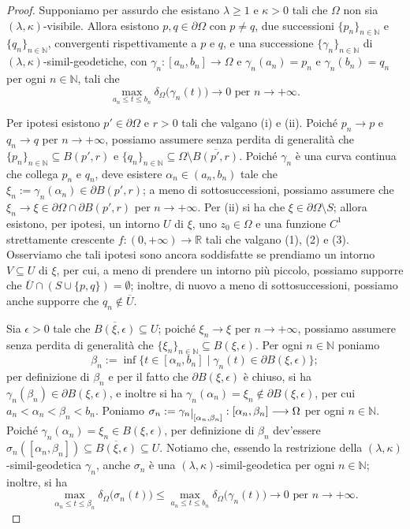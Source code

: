 \begin{proof}
    Supponiamo per assurdo che esistano $\lambda \ge 1$ e $\kappa>0$ tali che $\Omega$ non sia $(\lambda,\kappa)$-visibile. Allora esistono $p,q\in\partial\Omega$ con $p\not=q$, due successioni $\{p_n\}_{n\in\mathbb{N}}$ e $\{q_n\}_{n\in\mathbb{N}}$, convergenti rispettivamente a $p$ e $q$, e una successione $\{\gamma_n\}_{n\in\mathbb{N}}$ di $(\lambda,\kappa)$-simil-geodetiche, con $\gamma_n:[a_n,b_n]\longrightarrow\Omega$ e $\gamma_n(a_n)=p_n$ e $\gamma_n(b_n)=q_n$ per ogni $n\in\mathbb{N}$, tali che
    $$\max_{a_n\le t\le b_n}\delta_\Omega\big(\gamma_n(t)\big)\longrightarrow 0\text{ per }n\longrightarrow+\infty.$$

    Per ipotesi esistono $p'\in\partial\Omega$ e $r>0$ tali che valgano (i) e (ii). Poiché $p_n\longrightarrow p$ e $q_n\longrightarrow q$ per $n\longrightarrow+\infty$, possiamo assumere senza perdita di generalità che $\{p_n\}_{n\in\mathbb{N}}\subseteq B(p',r)$ e $\{q_n\}_{n\in\mathbb{N}}\subseteq \Omega\setminus\overline{B(p',r)}$. Poiché $\gamma_n$ è una curva continua che collega $p_n$ e $q_n$, deve esistere $\alpha_n\in(a_n,b_n)$ tale che $\xi_n:=\gamma_n(\alpha_n)\in\partial B(p',r)$; a meno di sottosuccessioni, possiamo assumere che $\xi_n\longrightarrow\xi\in\partial\Omega\cap\partial B(p',r)$ per $n\longrightarrow+\infty$. Per (ii) si ha che $\xi\in\partial\Omega\setminus S$; allora esistono, per ipotesi, un intorno $U$ di $\xi$, uno $z_0\in\Omega$ e una funzione $C^1$ strettamente crescente $f:(0,+\infty)\longrightarrow\mathbb{R}$ tali che valgano (1), (2) e (3). Osserviamo che tali ipotesi sono ancora soddisfatte se prendiamo un intorno $V \subseteq U$ di $\xi$, per cui, a meno di prendere un intorno più piccolo, possiamo supporre che $\overline{U}\cap(S\cup\{p,q\})=\emptyset$; inoltre, di nuovo a meno di sottosuccessioni, possiamo anche supporre che $q_n\not\in\overline{U}$.

    Sia $\epsilon>0$ tale che $\overline{B(\xi,\epsilon)}\subseteq U$; poiché $\xi_n\longrightarrow \xi$ per $n\longrightarrow+\infty$, possiamo assumere senza perdita di generalità che $\{\xi_n\}_{n\in\mathbb{N}}\subseteq B(\xi,\epsilon)$. Per ogni $n\in\mathbb{N}$ poniamo
    $$\beta_n:=\inf\{t\in[\alpha_n,b_n]\mid \gamma_n(t)\in\partial B(\xi,\epsilon)\};$$
    per definizione di $\beta_n$ e per il fatto che $\partial B(\xi,\epsilon)$ è chiuso, si ha $\gamma_n(\beta_n)\in\partial B(\xi,\epsilon)$, e inoltre si ha $\gamma_n(\alpha_n)=\xi_n\not\in\partial B(\xi,\epsilon)$, per cui $a_n<\alpha_n<\beta_n<b_n$. Poniamo $\sigma_n:=\gamma_n\restrict{[\alpha_n,\beta_n]}:[\alpha_n,\beta_n]\longrightarrow\Omega$ per ogni $n\in\mathbb{N}$. Poiché $\gamma_n(\alpha_n)=\xi_n\in B(\xi,\epsilon)$, per definizione di $\beta_n$ dev'essere $\sigma_n([\alpha_n,\beta_n])\subseteq\overline{B(\xi,\epsilon)}\subseteq U$. Notiamo che, essendo la restrizione della $(\lambda,\kappa)$-simil-geodetica $\gamma_n$, anche $\sigma_n$ è una $(\lambda,\kappa)$-simil-geodetica per ogni $n\in\mathbb{N}$; inoltre, si ha
    $$\max_{\alpha_n\le t\le \beta_n}\delta_\Omega\big(\sigma_n(t)\big)\le\max_{a_n\le t\le b_n}\delta_\Omega\big(\gamma_n(t)\big)\longrightarrow 0\text{ per }n\longrightarrow+\infty.$$


\end{proof}
